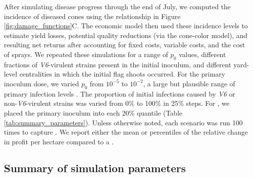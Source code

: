 \documentclass[10pt,a4paper]{article}
\begin{document}
After simulating disease progress through the end of July, we computed the incidence of diseased cones using the relationship in Figure \ref{fig:damage_functions}C. The economic model then used these incidence levels to estimate yield losses, potential quality reductions (via the cone-color model), and resulting net returns after accounting for fixed costs, variable costs, and the cost of sprays. We repeated these simulations for a range of $p_0$ values, different fractions of \textit{V6}-virulent strains present in the initial inoculum, and different yard-level centralities in which the initial flag shoots occurred. For the primary inoculum dose, we varied $p_0$ from $10^{-5}$ to $10^{-2}$, a large but plausible range of primary infection levels \parencite{Laurie2023}. The proportion of initial infections caused by\textit{ V6} or non-\textit{V6}-virulent strains was varied from 0\% to 100\% in 25\% steps. For , we placed the primary inoculum into each 20\% quantile (Table \ref{tab:summary_parameters}). Unless otherwise noted, each scenario was run 100 times to capture . We report either the mean or percentiles of the relative change in profit per hectare compared to a .

\subsection{Summary of simulation parameters}
\end{document}
